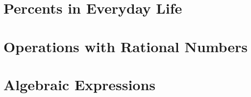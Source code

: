 \documentclass[12pt, fleqn, openany]{studyGuide}
\begin{document}
\chapter{Percents in Everyday Life}










\chapter{Operations with Rational Numbers}










\chapter{Algebraic Expressions}







\end{document}
